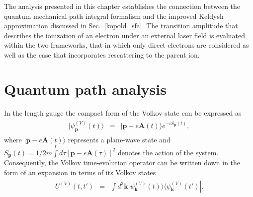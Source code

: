 The analysis presented in this chapter establishes the connection
between the quantum mechanical path integral formalism and the
improved Keldysh approximation discussed in Sec.~\ref{kopold_sfa}. The
transition amplitude that describes the ionization of an electron
under an external laser field is evaluated within the two frameworks,
that in which only direct electrons are considered as well as the case
that incorporates rescattering to the parent ion.



\section{\label{sec:q_paths} Quantum path analysis}

In the length gauge the compact form of the Volkov state can be
expressed as
\begin{eqnarray}
\label{eq:volkov_Lgauge}
\begin{split}
|\psi_{\mathbf{p}}^{(V)}(t)\rangle & = &
|\mathbf{p} - e\mathbf{A}(t)\rangle e^{-i S_{\mathbf{p}}(t)},
\end{split}
\end{eqnarray}
where $|\mathbf{p} - e\mathbf{A}(t)\rangle$ represents a plane-wave
state and
$S_{\mathbf{p}}(t) = 1/2m \int\limits^{t} d\tau [\mathbf{p} -
e\mathbf{A}(\tau)]^{2}$
denotes the action of the system. Consequently, the Volkov
time-evolution operator can be written down in the form of an
expansion in terms of its Volkov states
\begin{eqnarray}
\label{eq:te_volkov}
\begin{split}
U^{(V)}(t,t') & = & \int d^{3}\mathbf{k}
|\psi_{\mathbf{k}}^{(V)}(t) \rangle
\langle \psi_{\mathbf{k}}^{(V)}(t')|.
\end{split}
\end{eqnarray}

